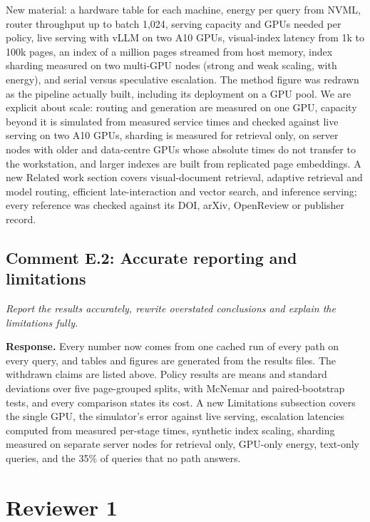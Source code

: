 \documentclass[11pt]{article}
\newcommand{\reviewer}[1]{{\color{blue!55!black}\itshape #1\par}}
\begin{document}
New material: a hardware table for each machine, energy per query from NVML, router throughput up to batch 1,024, serving capacity and GPUs needed per policy, live serving with vLLM on two A10 GPUs, visual-index latency from 1k to 100k pages, an index of a million pages streamed from host memory, index sharding measured on two multi-GPU nodes (strong and weak scaling, with energy), and serial versus speculative escalation. The method figure was redrawn as the pipeline actually built, including its deployment on a GPU pool. We are explicit about scale: routing and generation are measured on one GPU, capacity beyond it is simulated from measured service times and checked against live serving on two A10 GPUs, sharding is measured for retrieval only, on server nodes with older and data-centre GPUs whose absolute times do not transfer to the workstation, and larger indexes are built from replicated page embeddings. A new Related work section covers visual-document retrieval, adaptive retrieval and model routing, efficient late-interaction and vector search, and inference serving; every reference was checked against its DOI, arXiv, OpenReview or publisher record.

\subsection*{Comment E.2: Accurate reporting and limitations}
\reviewer{Report the results accurately, rewrite overstated conclusions and explain the limitations fully.}
\textbf{Response.} Every number now comes from one cached run of every path on every query, and tables and figures are generated from the results files. The withdrawn claims are listed above. Policy results are means and standard deviations over five page-grouped splits, with McNemar and paired-bootstrap tests, and every comparison states its cost. A new Limitations subsection covers the single GPU, the simulator's error against live serving, escalation latencies computed from measured per-stage times, synthetic index scaling, sharding measured on separate server nodes for retrieval only, GPU-only energy, text-only queries, and the 35\% of queries that no path answers.

\section*{Reviewer 1}
\end{document}
